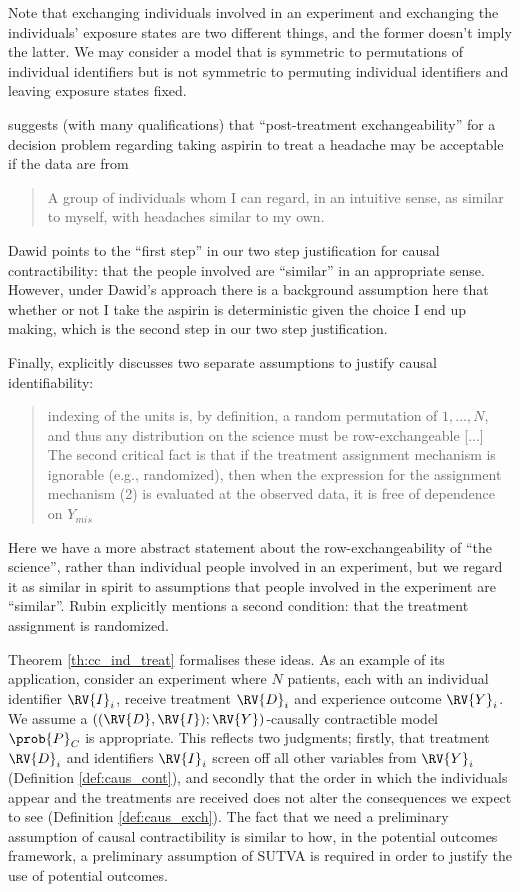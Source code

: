 Note that exchanging individuals involved in an experiment and exchanging the individuals' exposure states are two different things, and the former doesn't imply the latter. We may consider a model that is symmetric to permutations of individual identifiers but is not symmetric to permuting individual identifiers and leaving exposure states fixed.

\citet{dawid_decision-theoretic_2020} suggests (with many qualifications) that ``post-treatment exchangeability'' for a decision problem regarding taking aspirin to treat a headache may be acceptable if the data are from

\begin{quote}
    A group of individuals whom I can regard, in an intuitive sense, as similar to myself, with headaches similar to my own.
\end{quote}

Dawid points to the ``first step'' in our two step justification for causal contractibility: that the people involved are ``similar'' in an appropriate sense. However, under Dawid's approach there is a background assumption here that whether or not I take the aspirin is deterministic given the choice I end up making, which is the second step in our two step justification.

Finally, \citet{rubin_causal_2005} explicitly discusses two separate assumptions to justify causal identifiability:

\begin{quote}
    indexing of the units is, by definition, a random permutation of $1,..., N$, and thus any distribution on the science must be row-exchangeable [...] The second critical fact is that if the treatment assignment mechanism is ignorable (e.g., randomized), then when the expression for the assignment mechanism (2) is evaluated at the observed data, it is free of dependence on $Y_{mis}$
\end{quote}

Here we have a more abstract statement about the row-exchangeability of ``the science'', rather than individual people involved in an experiment, but we regard it as similar in spirit to assumptions that people involved in the experiment are ``similar''. Rubin explicitly mentions a second condition: that the treatment assignment is randomized.

Theorem \ref{th:cc_ind_treat} formalises these ideas. As an example of its application, consider an experiment where $N$ patients, each with an individual identifier $\RV{I}_i$, receive treatment $\RV{D}_i$ and experience outcome $\RV{Y}_i$. We assume a $((\RV{D},\RV{I});\RV{Y})$-causally contractible model $\prob{P}_C$ is appropriate. This reflects two judgments; firstly, that treatment $\RV{D}_i$ and identifiers $\RV{I}_i$ screen off all other variables from $\RV{Y}_i$ (Definition \ref{def:caus_cont}), and secondly that the order in which the individuals appear and the treatments are received does not alter the consequences we expect to see (Definition \ref{def:caus_exch}). The fact that we need a preliminary assumption of causal contractibility is similar to how, in the potential outcomes framework, a preliminary assumption of SUTVA is required in order to justify the use of potential outcomes.

